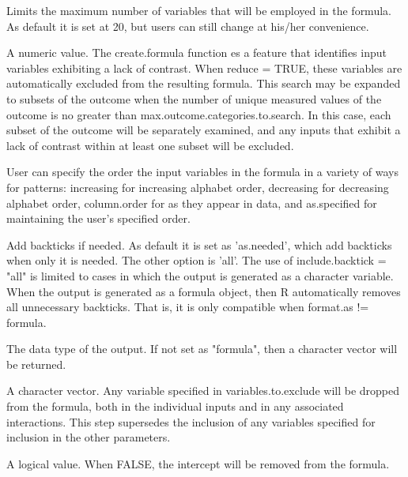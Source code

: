 \documentclass[a4paper]{book}
\begin{document}
\begin{Arguments}
\begin{ldescription}
\item[\code{max.input.categories}] Limits the maximum number of variables that will
be employed in the formula. As default it is set at 20, but users can still
change at his/her convenience.

\item[\code{max.outcome.categories.to.search}] A numeric value. The create.formula
function es a feature that identifies input variables exhibiting a lack of
contrast. When reduce = TRUE, these variables are automatically excluded
from the resulting formula. This search may be expanded to subsets of the
outcome when the number of unique measured values of the outcome is no
greater than max.outcome.categories.to.search. In this case, each subset
of the outcome will be separately examined, and any inputs that exhibit a
lack of contrast within at least one subset will be excluded.

\item[\code{order.as}] User can specify the order the input variables in the
formula in a variety of ways for patterns: increasing for increasing alphabet
order, decreasing for decreasing alphabet order, column.order for as they
appear in data, and as.specified for maintaining the user's specified order.

\item[\code{include.backtick}] Add backticks if needed. As default it is set as
'as.needed', which add backticks when only it is needed. The other option is
'all'. The use of include.backtick = "all" is limited to cases in which the
output is generated as a character variable. When the output is generated
as a formula object, then R automatically removes all unnecessary backticks.
That is, it is only compatible when format.as != formula.

\item[\code{format.as}] The data type of the output. If not set as "formula", then a
character vector will be returned.

\item[\code{variables.to.exclude}] A character vector. Any variable specified in
variables.to.exclude will be dropped from the formula, both in the individual
inputs and in any associated interactions. This step supersedes the inclusion
of any variables specified for inclusion in the other parameters.

\item[\code{include.intercept}] A logical value. When FALSE, the intercept will be
removed from the formula.
\end{ldescription}
\end{Arguments}
\end{document}
